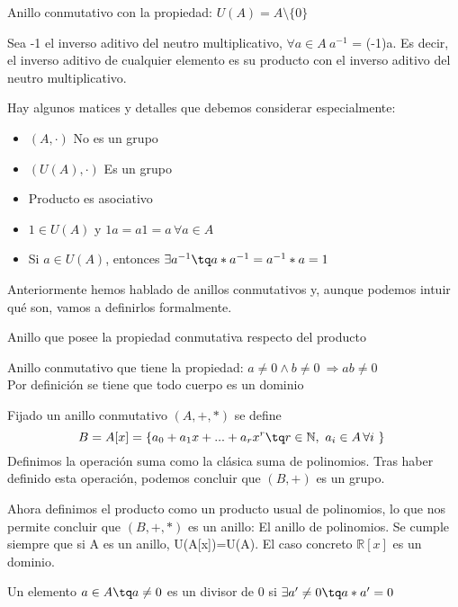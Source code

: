 \documentclass[nochap]{apuntes}
\begin{document}
\begin{defn}[Cuerpo]
 Anillo conmutativo con la propiedad: $U(A)=A \setminus \{0\}$
\end{defn}

\obs Sea -1 el inverso aditivo del neutro multiplicativo, $\forall a \in A \ a^{-1}$ = (-1)a. Es decir, el inverso aditivo de cualquier
elemento es su producto con el inverso aditivo del neutro multiplicativo.

Hay algunos matices y detalles que debemos considerar especialmente:
\begin{itemize}
 \item $(A, \cdot)$ No es un grupo
 \item $(U(A), \cdot)$ Es un grupo
 \item Producto es asociativo
 \item $1 \in U(A)$ y $1a=a1=a\, \forall a \in A$
 \item Si $a \in U(A)$, entonces $\exists a^{-1} \tq a*a^{-1}=a^{-1}*a=1$
\end{itemize}

Anteriormente hemos hablado de anillos conmutativos y, aunque podemos intuir qué son, vamos a definirlos formalmente.
\begin{defn}
 Anillo que posee la propiedad conmutativa respecto del producto
\end{defn}

\begin{defn}[Dominio]
 Anillo conmutativo que tiene la propiedad: $a\neq 0 \wedge b\neq 0 \ \Rightarrow ab \neq 0$\\
 Por definición se tiene que todo cuerpo es un dominio
\end{defn}

\begin{example}
 Fijado un anillo conmutativo $(A, +, *)$ se define \[ B=A[x]=\{a_0+a_1x+...+a_rx^{r} \tq r \in \mathbb{N}, \ a_i \in A\, \forall i \} \]
 Definimos la operación suma como la clásica suma de polinomios. Tras haber definido esta operación, podemos concluir que $(B, +)$ es un grupo.

 Ahora definimos el producto como un producto usual de polinomios, lo que nos permite concluir que $(B, +, *)$ es un anillo: El anillo
 de polinomios.
 Se cumple siempre que si A es un anillo, U(A[x])=U(A). El caso concreto $\mathbb{R}[x]$  es un dominio.
\end{example}

\begin{defn}[Divisor\IS de 0]
 Un elemento $a\in A \tq a\neq 0$  es un divisor de 0 si $\exists a'\neq 0 \tq a*a'=0$
\end{defn}
\end{document}
